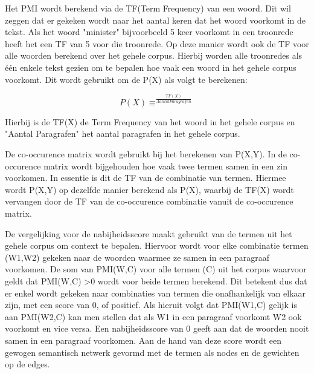 Het PMI wordt berekend via de TF(Term Frequency) van een woord. Dit wil zeggen dat er gekeken wordt naar het aantal keren dat het woord voorkomt in de tekst. Als het woord "minister" bijvoorbeeld 5 keer voorkomt in een troonrede heeft het een TF van 5 voor die troonrede. Op deze manier wordt ook de TF voor alle woorden berekend over het gehele corpus. Hierbij worden alle troonredes als één enkele tekst gezien om te bepalen hoe vaak een woord in het gehele corpus voorkomt. Dit wordt gebruikt om de P(X) als volgt te berekenen:

$$P(X)\equiv^{\frac{TF(X)}{Aantal Paragrafen}}$$

Hierbij is de TF(X) de Term Frequency van het woord in het gehele corpus en "Aantal Paragrafen" het aantal paragrafen in het gehele corpus.

De co-occurence matrix wordt gebruikt bij het berekenen van P(X,Y). In de co-occurence matrix wordt bijgehouden hoe vaak twee termen samen in een zin voorkomen. In essentie is dit de TF van de combinatie van termen. Hiermee wordt P(X,Y) op dezelfde manier berekend als P(X), waarbij de TF(X) wordt vervangen door de TF van de co-occurence combinatie vanuit de co-occurence matrix.

De vergelijking voor de nabijheidsscore maakt gebruikt van de termen uit het gehele corpus om context te bepalen. Hiervoor wordt voor elke combinatie termen (W1,W2) gekeken naar de woorden waarmee ze samen in een paragraaf voorkomen. De som van PMI(W,C) voor alle termen (C) uit het corpus waarvoor geldt dat PMI(W,C) \textgreater 0 wordt voor beide termen berekend. Dit betekent dus dat er enkel wordt gekeken naar combinaties van termen die onafhankelijk van elkaar zijn, met een score van 0, of  positief. Als hieruit volgt dat PMI(W1,C) gelijk is aan PMI(W2,C) kan men stellen dat als W1 in een paragraaf voorkomt W2 ook voorkomt en vice versa. Een nabijheidsscore van 0 geeft aan dat de woorden nooit samen in een paragraaf voorkomen. Aan de hand van deze score wordt een gewogen semantisch netwerk gevormd met de termen als nodes en de gewichten op de edges. 

